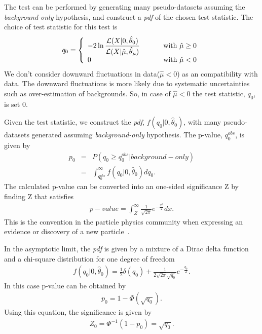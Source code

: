 The test can be performed by generating many pseudo-datasets assuming the 
\textit{background-only} hypothesis, and construct a \textit{pdf} 
of the chosen test statistic. The choice of test statistic for 
this test is  
\begin{eqnarray} 
q_0
=
\left\{ \begin{array}{l l}
\displaystyle
-2 \ln \frac{\mathcal{L}( X | 0, \hat{\theta}_0)}
            {\mathcal{L}( X | \hat{\mu}, \hat{\theta}_\mu)} 
             & \qquad \textrm{ with } \hat{\mu} \ge 0 \\   
0 
             & \qquad \textrm{ with } \hat{\mu} < 0    
\end{array} \right.
\end{eqnarray} 
We don't consider downward fluctuations in data($\hat{\mu} < 0$) as an 
compatibility with data. The downward fluctuations 
is more likely due to systematic uncertainties such as over-estimation 
of backgrounds. So, in case of $\hat{\mu} < 0$ the test statistic, $q_0$, is set 0. 

Given the test statistic, we construct the \textit{pdf}, $f(q_0|0,\hat{\theta}_0)$, 
with many pseudo-datasets generated assuming \textit{background-only} hypothesis.
The p-value, $q_0^{obs}$, is given by 
\begin{eqnarray} 
p_0
&=& P \left( q_0 \ge q_0^{obs} | background-only \right)  \\
&=& \int^{\infty}_{ q_0^{obs} }  f\left( q_0 | 0, \hat{\theta}_0 \right) dq_0.
\end{eqnarray} 
The calculated p-value can be converted into an one-sided %
significance Z by finding Z that satisfies 
\begin{eqnarray} 
p-value 
= 
\int^{\infty}_{Z} \frac{1}{\sqrt{2\pi}} e^{ -\frac{x^2}{2}} dx.   
\end{eqnarray} 
This is the convention in the particle physics community 
when expressing an evidence or discovery of a new particle~\cite{Beringer:1900zz}.

In the asymptotic limit, the \textit{pdf} is given by a mixture of 
a Dirac delta function and a chi-square distribution for one 
degree of freedom~\cite{combination_stat}
\begin{eqnarray} 
f\left(q_0 | 0, \hat{\theta}_0 \right) 
= 
\frac{1}{2} \delta \left(q_0\right)  
+ 
\frac{1}{2\sqrt{2\pi}\sqrt{q_0}} e^{-\frac{q_0}{2}}.
\end{eqnarray}
In this case p-value can be obtained by 
\begin{eqnarray}
p_0 = 1 - \Phi \left( \sqrt{q_0} \right).
\end{eqnarray} 
Using this equation, the significance is given by  
\begin{eqnarray} 
Z_0 = \Phi^{-1} \left( 1 - p_0 \right) = \sqrt{q_0}.
\end{eqnarray} 

